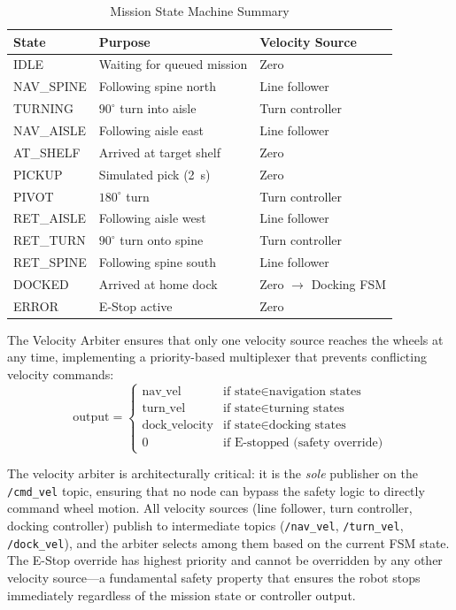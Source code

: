 \documentclass[12pt,a4paper,oneside]{report}
\begin{document}
\begin{table}[H]
\centering
\caption{Mission State Machine Summary}
\label{tab:fsm}
\begin{tabular}{p{3cm} p{5.5cm} p{3.5cm}}
\toprule
\textbf{State} & \textbf{Purpose} & \textbf{Velocity Source} \\
\midrule
IDLE & Waiting for queued mission & Zero \\
NAV\_SPINE & Following spine north & Line follower \\
TURNING & $90^{\circ}$ turn into aisle & Turn controller \\
NAV\_AISLE & Following aisle east & Line follower \\
AT\_SHELF & Arrived at target shelf & Zero \\
PICKUP & Simulated pick (2~s) & Zero \\
PIVOT & $180^{\circ}$ turn & Turn controller \\
RET\_AISLE & Following aisle west & Line follower \\
RET\_TURN & $90^{\circ}$ turn onto spine & Turn controller \\
RET\_SPINE & Following spine south & Line follower \\
DOCKED & Arrived at home dock & Zero $\rightarrow$ Docking FSM \\
ERROR & E-Stop active & Zero \\
\bottomrule
\end{tabular}
\end{table}

The Velocity Arbiter ensures that only one velocity source reaches the wheels at any time, implementing a priority-based multiplexer that prevents conflicting velocity commands:
\begin{equation}
\text{output} = \begin{cases}
\text{nav\_vel} & \text{if state} \in \text{navigation states} \\
\text{turn\_vel} & \text{if state} \in \text{turning states} \\
\text{dock\_velocity} & \text{if state} \in \text{docking states} \\
0 & \text{if E-stopped (safety override)}
\end{cases}
\label{eq:vel_arbiter}
\end{equation}

The velocity arbiter is architecturally critical: it is the \textit{sole} publisher on the \texttt{/cmd\_vel} topic, ensuring that no node can bypass the safety logic to directly command wheel motion. All velocity sources (line follower, turn controller, docking controller) publish to intermediate topics (\texttt{/nav\_vel}, \texttt{/turn\_vel}, \texttt{/dock\_vel}), and the arbiter selects among them based on the current FSM state. The E-Stop override has highest priority and cannot be overridden by any other velocity source---a fundamental safety property that ensures the robot stops immediately regardless of the mission state or controller output.
\end{document}
